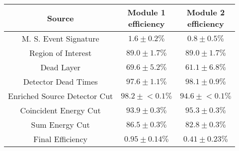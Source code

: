 \begin{tabular}{|c|c|c|}
\hline
  Source & \makecell{Module 1\\efficiency} & \makecell{Module 2\\efficiency} \\
\hline
  M. S. Event Signature & $1.6 \pm 0.2\%$ & $0.8 \pm 0.5\%$ \\
  Region of Interest & $89.0 \pm 1.7\%$ & $89.0 \pm 1.7\%$ \\
  Dead Layer & $69.6 \pm 5.2\%$ & $61.1 \pm 6.8\%$ \\
  Detector Dead Times & $97.6 \pm 1.1\%$ & $98.1 \pm 0.9\%$ \\
  Enriched Source Detector Cut & $98.2 \pm{}<\!0.1\%$ & $94.6 \pm{}<\!0.1\%$ \\
  Coincident Energy Cut & $93.9 \pm 0.3\%$ & $95.3 \pm 0.3\%$ \\
  Sum Energy Cut & $86.5 \pm 0.3\%$ & $82.8 \pm 0.3\%$ \\
  \hline Final Efficiency & $0.95 \pm 0.14\%$ & $0.41 \pm 0.23\%$ \\
\hline
\end{tabular}
